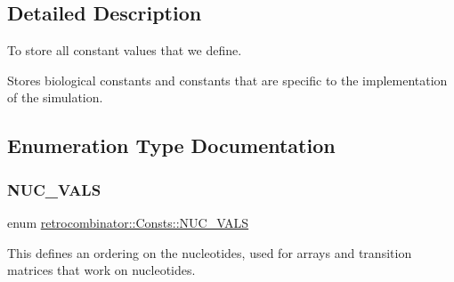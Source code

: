 \subsection{Detailed Description}
To store all constant values that we define. 

Stores biological constants and constants that are specific to the implementation of the simulation. 

\subsection{Enumeration Type Documentation}
\mbox{\label{namespaceretrocombinator_1_1Consts_a274e9195aeee16a2bc05c6c2d13da17d}} 
\subsubsection{\texorpdfstring{N\+U\+C\+\_\+\+V\+A\+LS}{NUC\_VALS}}
{\footnotesize\ttfamily enum \hyperlink{namespaceretrocombinator_1_1Consts_a274e9195aeee16a2bc05c6c2d13da17d}{retrocombinator\+::\+Consts\+::\+N\+U\+C\+\_\+\+V\+A\+LS}}



This defines an ordering on the nucleotides, used for arrays and transition matrices that work on nucleotides. 

